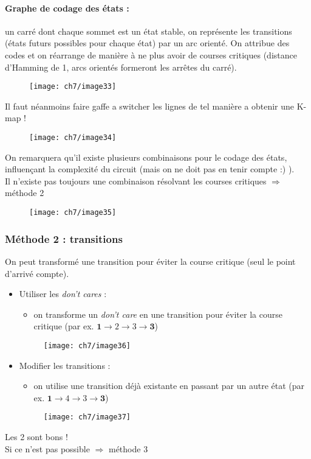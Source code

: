 \paragraph{Graphe de codage des états :} un carré dont chaque sommet est un état stable, on représente les transitions (états futurs possibles pour chaque état) par un arc orienté. On attribue des codes et on réarrange de manière à ne plus avoir de courses critiques (distance d'Hamming de 1, arcs orientés formeront les arrêtes du carré). 
\begin{figure}[H]
	\centering
	\texttt{[image: ch7/image33]}
\end{figure}
Il faut néanmoins faire gaffe a switcher les lignes de tel manière a obtenir une K-map !
\begin{figure}[H]
	\centering
	\texttt{[image: ch7/image34]}
\end{figure}
On remarquera qu'il existe plusieurs combinaisons pour le codage des états, influençant la complexité du circuit (mais on ne doit pas en tenir compte :) ).\\
Il n'existe pas toujours une combinaison résolvant les courses critiques $\Rightarrow$ méthode 2
\begin{figure}[H]
	\centering
	\texttt{[image: ch7/image35]}
\end{figure}
\subsubsection{Méthode 2 : transitions}
On peut transformé une transition pour éviter la course critique (seul le point d'arrivé compte).
\begin{itemize}
	\item Utiliser les \textit{don't cares} :
	\begin{itemize}
		\item on transforme un \textit{don't care} en une transition pour éviter la course critique (par ex. $\textbf{1}\rightarrow 2\rightarrow 3\rightarrow \textbf{3}$)
	\end{itemize}
	\begin{figure}[H]
		\centering
		\texttt{[image: ch7/image36]}
	\end{figure}
	\item Modifier les transitions :
	\begin{itemize}
		\item on utilise une transition déjà existante en passant par un autre état (par ex. $\textbf{1}\rightarrow 4\rightarrow 3\rightarrow \textbf{3}$)
	\end{itemize}
	\begin{figure}[H]
		\centering
		\texttt{[image: ch7/image37]}
	\end{figure}
\end{itemize}
Les 2 sont bons !\\
Si ce n'est pas possible $\Rightarrow$ méthode 3
